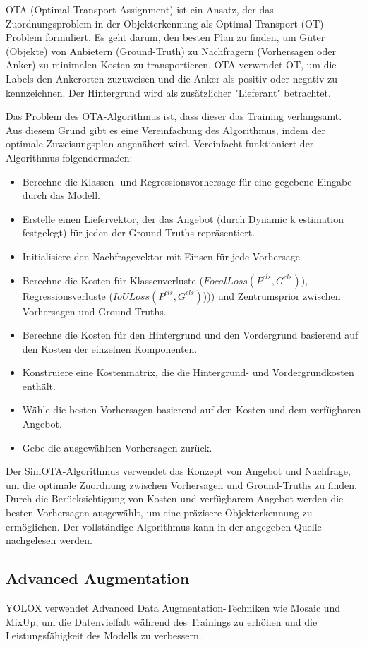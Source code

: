 OTA (Optimal Transport Assignment) ist ein Ansatz, der das Zuordnungsproblem in der Objekterkennung als Optimal Transport (OT)-Problem formuliert. Es geht darum, den besten Plan zu finden, um Güter (Objekte) von Anbietern (Ground-Truth) zu Nachfragern (Vorhersagen oder Anker) zu minimalen Kosten zu transportieren. OTA verwendet OT, um die Labels den Ankerorten zuzuweisen und die Anker als positiv oder negativ zu kennzeichnen. Der Hintergrund wird als zusätzlicher "Lieferant" betrachtet. 

Das Problem des OTA-Algorithmus ist, dass dieser das Training verlangsamt. Aus diesem Grund gibt es eine Vereinfachung des Algorithmus, indem der optimale Zuweisungsplan angenähert wird. Vereinfacht funktioniert der Algorithmus folgendermaßen:
\begin{itemize}
	\item Berechne die Klassen- und Regressionsvorhersage für eine gegebene Eingabe durch das Modell.
	\item Erstelle einen Liefervektor, der das Angebot (durch Dynamic k estimation festgelegt) für jeden der Ground-Truths repräsentiert.
	\item Initialisiere den Nachfragevektor mit Einsen für jede Vorhersage.
	\item Berechne die Kosten für Klassenverluste ($FocalLoss(P^{cls}, G^{cls})$), Regressionsverluste ($IoULoss(P^{cls}, G^{cls})$))) und Zentrumsprior zwischen Vorhersagen und Ground-Truths.
	\item Berechne die Kosten für den Hintergrund und den Vordergrund basierend auf den Kosten der einzelnen Komponenten.
	\item Konstruiere eine Kostenmatrix, die die Hintergrund- und Vordergrundkosten enthält.
	\item Wähle die besten Vorhersagen basierend auf den Kosten und dem verfügbaren Angebot.
	\item Gebe die ausgewählten Vorhersagen zurück.
\end{itemize}

Der SimOTA-Algorithmus verwendet das Konzept von Angebot und Nachfrage, um die optimale Zuordnung zwischen Vorhersagen und Ground-Truths zu finden. Durch die Berücksichtigung von Kosten und verfügbarem Angebot werden die besten Vorhersagen ausgewählt, um eine präzisere Objekterkennung zu ermöglichen. Der vollständige Algorithmus kann in der angegeben Quelle nachgelesen werden.  \cite{yoloxExplanationSimOTA}


\subsection{Advanced Augmentation}
YOLOX verwendet Advanced Data Augmentation-Techniken wie Mosaic und MixUp, um die Datenvielfalt während des Trainings zu erhöhen und die Leistungsfähigkeit des Modells zu verbessern.

